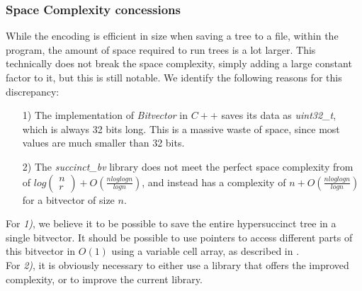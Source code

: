 \documentclass{article}
\begin{document}


\subsubsection{Space Complexity concessions}
While the encoding is efficient in size when saving a tree to a file, within the program, the amount of space required to run trees is a lot larger. This technically does not break the space complexity, simply adding a large constant factor to it, but this is still notable. We identify the following reasons for this discrepancy:\\
\begin{itemize}
	\item[1)] The implementation of \textit{Bitvector} in $C++$ saves its data as \textit{uint32\_t}, which is always 32 bits long. This is a massive waste of space, since most values are much smaller than 32 bits.
	\item[2)] The \textit{succinct\_bv} library does not meet the perfect space complexity from \cite{succinctBV} of $log(\begin{array}{c} n \\ r \end{array}) + O(\frac{n log log n}{log n})$, and instead has a complexity of $n + O(\frac{n log log n}{log n})$ for a bitvector of size $n$.
\end{itemize}
For \textit{1)}, we believe it to be possible to save the entire hypersuccinct tree in a single bitvector. It should be possible to use pointers to access different parts of this bitvector in $O(1)$ using a variable cell array, as described in \cite{universalSuccinct}.\\
For \textit{2)}, it is obviously necessary to either use a library that offers the improved complexity, or to improve the current library.
\end{document}
